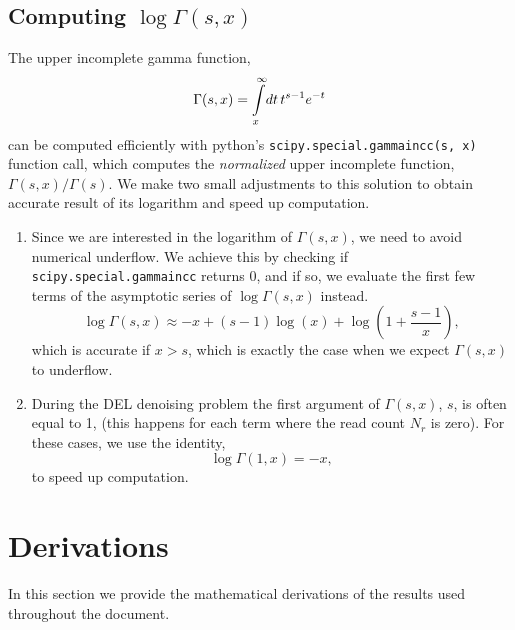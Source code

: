 \documentclass[letter,10pt,oneside]{article}
\newcommand{\bel}{\begin{equation}}
\newcommand{\eel}{\end{equation}}
\newcommand{\be}{\begin{equation*}}
\newcommand{\ee}{\end{equation*}}
\newcommand{\+}{^\dagger}
\begin{document}
\begin{appendix}
\subsection{Computing $\log \Gamma(s, x)$}
The upper incomplete gamma function,
\bel
  \Gamma(s, x) = \intop_x^\infty \! dt\, t^{s-1} e^{-t}
\eel
can be computed efficiently with python's \texttt{scipy.special.gammaincc(s, x)} function call, which computes the \emph{normalized} upper incomplete function, $\Gamma(s,x) / \Gamma(s)$. We make two small adjustments to this solution to obtain accurate result of its logarithm and speed up computation.
\begin{enumerate}
  \item Since we are interested in the logarithm of $\Gamma(s, x)$, we need to avoid numerical underflow. We achieve this by checking if \texttt{scipy.special.gammaincc} returns 0, and if so, we evaluate the first few terms of the asymptotic series of $\log \Gamma(s,x)$ instead.
  \be
    \log \Gamma(s,x) \approx -x + (s-1) \log(x) + \log\left(1 + \frac{s-1}{x}\right),
  \ee
  which is accurate if $x > s$, which is exactly the case when we expect $\Gamma(s,x)$ to underflow.

  \item During the DEL denoising problem the first argument of $\Gamma(s, x)$, $s$, is often equal to 1, (this happens for each term where the read count $N_r$ is zero). For these cases, we use the identity,
  \be
    \log\Gamma(1,x) = -x,
  \ee
  to speed up computation.
\end{enumerate}

\section{Derivations}
In this section we provide the mathematical derivations of the results used throughout the document.


\end{appendix}
\end{document}

